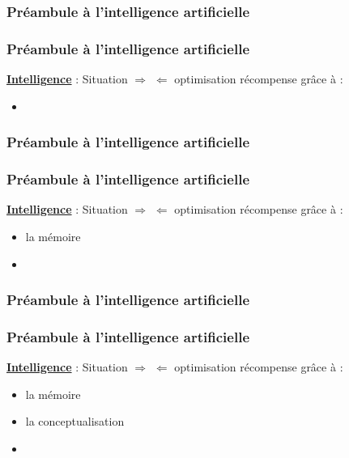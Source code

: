 \documentclass{formation}
\begin{document}
\begin{frame}
  \frametitle{Préambule à l'intelligence artificielle}
\end{frame}

\begin{frame}
  \frametitle{Préambule à l'intelligence artificielle}
  \underline{\textbf{Intelligence}} :
  \newline
  \newline
  Situation $\Rightarrow$  $\Leftarrow$ optimisation récompense
  \newline
  \newline
  grâce à :
  \begin{itemize}
  \item {}
  \end{itemize}
\end{frame}

\begin{frame}
  \frametitle{Préambule à l'intelligence artificielle}
\end{frame}

\begin{frame}
  \frametitle{Préambule à l'intelligence artificielle}
  \underline{\textbf{Intelligence}} :
  \newline
  \newline
  Situation $\Rightarrow$  $\Leftarrow$ optimisation récompense
  \newline
  grâce à :
  \begin{itemize}
  \item la mémoire
  \item {}
  \end{itemize}
\end{frame}

\begin{frame}
  \frametitle{Préambule à l'intelligence artificielle}
\end{frame}

\begin{frame}
  \frametitle{Préambule à l'intelligence artificielle}
  \underline{\textbf{Intelligence}} :
  \newline
  \newline
  Situation $\Rightarrow$  $\Leftarrow$ optimisation récompense
  \newline
  grâce à :
  \begin{itemize}
  \item la mémoire
  \item la conceptualisation
  \item {}
  \end{itemize}
\end{frame}
\end{document}
